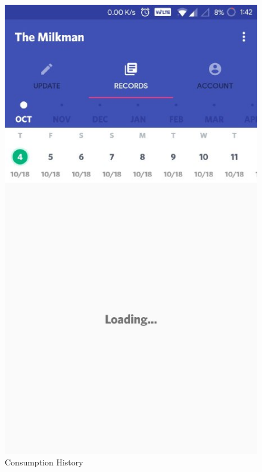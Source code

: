 \begin{figure}[h]
  \begin{center}
\includegraphics[scale=0.6]{3/eight.jpeg}
\caption{Consumption History}
\label{fig:two}
\end{center}
\end{figure}

